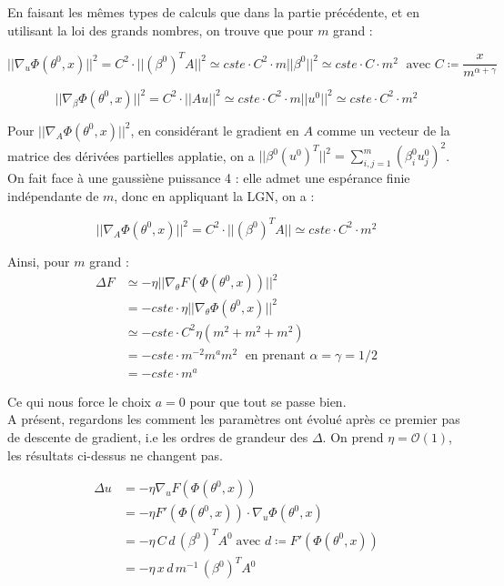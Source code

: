 \documentclass[a4paper, 11pt, french]{article}
\begin{document}
	En faisant les mêmes types de calculs que dans la partie précédente, et en utilisant la loi des grands nombres, on trouve que pour $m$ grand :
	
	\[ || \nabla_{u} \Phi(\theta^0, x) ||^2 = C^2 \cdot || (\beta^0)^T A ||^2 \simeq
	cste \cdot C^2 \cdot m ||\beta^0||^2 \simeq cste \cdot C \cdot m^2 \; 
	\text{ avec $C \coloneqq \frac{x}{m^{\alpha + \gamma}}$} \]
	
	\[ || \nabla_{\beta} \Phi(\theta^0, x) ||^2 = C^2 \cdot || A u ||^2 \simeq
	cste \cdot C^2 \cdot m ||u^0||^2 \simeq cste \cdot C^2 \cdot m^2 \]
	
	Pour $|| \nabla_{A} \Phi(\theta^0, x) ||^2$, en considérant le gradient en $A$ comme un vecteur de la matrice des dérivées partielles applatie, on a 
	$|| \beta^0 (u^0)^T ||^2 = \sum_{i,j = 1}^m (\beta^0_i u^0_j)^2$. On fait face à une gaussiène puissance 4 : elle admet une espérance finie indépendante de $m$, donc en appliquant la LGN, on a :
	
	\[ || \nabla_{A} \Phi(\theta^0, x) ||^2 = C^2 \cdot || (\beta^0)^T A || \simeq
	cste \cdot C^2 \cdot m^2 \]
	
	Ainsi, pour $m$ grand :
	\begin{align*}
		\Delta F &\simeq -\eta || \nabla_{\theta} F(\Phi(\theta^0, x)) ||^2 \\
		&= - cste \cdot \eta || \nabla_{\theta} \Phi(\theta^0, x) ||^2 \\
		&\simeq - cste \cdot C^2 \eta (m^2 + m^2 + m^2) \\
		&= -cste \cdot m^{-2} m^a m^2 \; \text{ en prenant $\alpha = \gamma = 1/2$}\\
		&= -cste \cdot  m^a
	\end{align*}	
	
	Ce qui nous force le choix $a = 0$ pour que tout se passe bien. \\
	
	A présent, regardons les comment les paramètres ont évolué après ce premier pas de descente de gradient, i.e les ordres de grandeur des $\Delta$.
	On prend $\eta = \mathcal{O}(1)$, les résultats ci-dessus ne changent pas.

	
 \begin{align*}
	 	\Delta u &= - \eta \nabla_u F(\Phi(\theta^0, x)) \\
	 	&= - \eta F'(\Phi(\theta^0, x)) \cdot \nabla_{u} \Phi(\theta^0, x) \\
	 	&= -\eta \, C \, d \, (\beta^0)^T A^0 \; \text{avec $d \coloneqq F'(\Phi(\theta^0, x))$} \\
	 	&= -\eta \, x \, d \, m^{-1} \, (\beta^0)^T A^0
 \end{align*}
\end{document}
